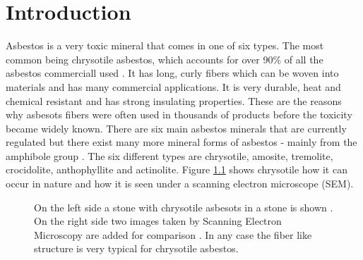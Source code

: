\chapter{Introduction}

Asbestos is a very toxic mineral that comes in one of six types. The most common being chrysotile asbestos, which accounts for over 90\% of all the asbestos commerciall used \cite{asbestosMaacenter}. It has long, curly fibers which can be woven into materials and has many commercial applications. It is very durable, heat and chemical resistant and has strong insulating properties. These are the reasons why asbesots fibers were often used in thousands of products before the toxicity became widely known. There are six main asbestos minerals that are currently regulated but there exist many more mineral forms of asbestos - mainly from the amphibole group \cite{environmental2008framework}. The six different types are chrysotile, amosite, tremolite, crocidolite, anthophyllite and actinolite. Figure \ref{fig:chrysotile} shows chrysotile how it can occur in nature and how it is seen under a scanning electron microscope (SEM).

\begin{figure}[h]
\centering

\caption{On the left side a stone with chrysotile asbesots in a stone is shown \cite{chrysoltileFullSizeImage}. On the right side two images taken by Scanning Electron Microscopy are added for comparison \cite{mohammed2015}. In any case the fiber like structure is very typical for chrysotile asbestos.}
\label{fig:chrysotile}
\end{figure}

